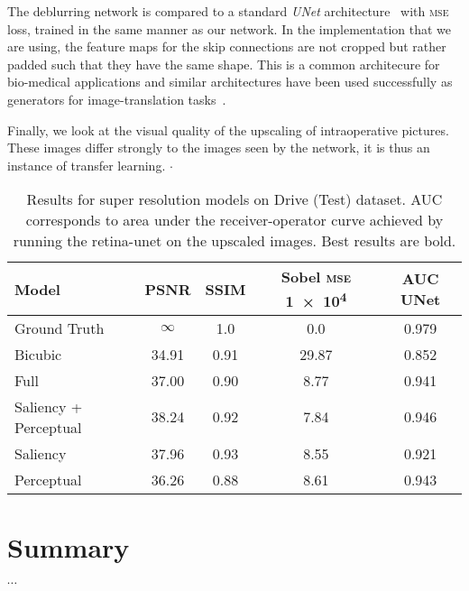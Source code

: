\documentclass{scrartcl}
\begin{document}
The deblurring network is compared to a standard \textit{UNet} architecture~\cite{Unet} with \textsc{mse} loss, trained in the same manner as our network.
In the implementation that we are using, the feature maps for the skip connections are not cropped but rather padded such that they have the same shape.
This is a common architecure for bio-medical applications and similar architectures have been used successfully as generators for image-translation tasks~\cite{PatchGAN}.

Finally, we look at the visual quality of the upscaling of intraoperative pictures.
These images differ strongly to the images seen by the network, it is thus an instance of transfer learning.
$\cdot$


\begin{table}[]
\centering
\caption{Results for super resolution models on Drive (Test) dataset.
  AUC corresponds to area under the receiver-operator curve achieved by running the retina-unet on the upscaled images.
  Best results are bold.
}

\label{tab:results-sr}
\begin{tabular}{@{}lS[table-format=2.2]S[table-format=2.2]S[table-format=2.2]S[table-format=2.3]@{}}
\toprule
{Model} & {PSNR} & {SSIM} & {Sobel \textsc{mse} \SI{1e4}{}} & {AUC UNet} \\ \midrule
Ground Truth & $\infty$ & 1.0 & 0.0 & 0.979 \\
Bicubic & 34.91 & 0.91 & 29.87 &  0.852 \\
Full & 37.00 & 0.90 & 8.77 & 0.941 \\
Saliency + Perceptual & 38.24 & 0.92 & 7.84 & 0.946 \\
Saliency & 37.96 & 0.93 & 8.55 & 0.921 \\
Perceptual & 36.26 & 0.88 & 8.61 & 0.943 \\
\bottomrule
\end{tabular}
\end{table}


\section{Summary}
$\cdots$

\printbibliography
\end{document}
